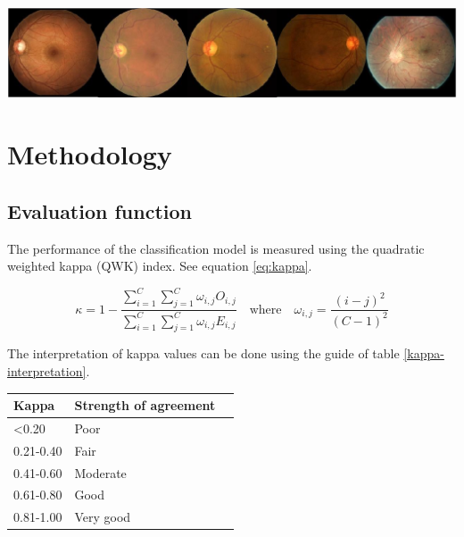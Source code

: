 \documentclass[a0,portrait]{a0poster}
\begin{document}
\begin{multicols}{3}
\begin{center}
	\includegraphics[width=20cm]{5classes.eps}
	\label{image-classes}
\end{center}


\color{DarkSlateGray} %


\section*{Methodology}

\subsection*{Evaluation function}

The performance of the classification model is measured using the quadratic weighted kappa  (QWK) index. See equation \ref{eq:kappa}. 

\begin{equation}\label{eq:kappa}
\kappa = 1 - \frac{ \sum_{i=1}^C \sum_{j=1}^C \omega_{i,j} O_{i,j} }
{\sum_{i=1}^C \sum_{j=1}^C  \omega_{i,j} E_{i,j}}
\quad \textrm{where} \quad \omega_{i,j} = \frac{(i-j)^2}{(C - 1)^2}
\end{equation}

The interpretation of kappa values can be done using the guide of table \ref{kappa-interpretation}.

\begin{center}
	\begin{tabular}{llr}
		\hline
		Kappa    & Strength of agreement \\
		\hline
	    \textless 0.20 		& Poor \\
		0.21-0.40 	& Fair \\
		0.41-0.60 	& Moderate \\
		0.61-0.80 	& Good \\
		0.81-1.00 	& Very good \\
		\hline
	\end{tabular}
	\label{kappa-interpretation}
\end{center}


\end{multicols}
\end{document}
